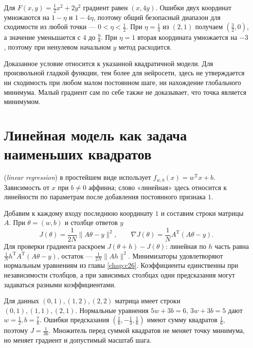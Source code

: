 \begin{example}Для \(F(x,y)=\frac12x^2+2y^2\) градиент равен \((x,4y)\). Ошибки двух координат умножаются на \(1-\eta\) и \(1-4\eta\), поэтому общий безопасный диапазон для сходимости из любой точки --- \(0<\eta<\frac12\). При \(\eta=\frac14\) из \((2,1)\) получаем \((\frac32,0)\), а значение уменьшается с \(4\) до \(\frac98\). При \(\eta=1\) вторая координата умножается на \(-3\), поэтому при ненулевом начальном \(y\) метод расходится.\end{example}
Доказанное условие относится к указанной квадратичной модели. Для произвольной гладкой функции, тем более для нейросети, здесь не утверждается ни сходимость при любом малом постоянном шаге, ни нахождение глобального минимума. Малый градиент сам по себе также не доказывает, что точка является минимумом.
\section{Линейная модель как задача наименьших квадратов}
\begin{definition} (\emph{linear regression}) в простейшем виде использует \(f_{w,b}(x)=w^{\mathrm T}x+b\). Зависимость от \(x\) при \(b\ne0\) аффинна; слово «линейная» здесь относится к линейности по параметрам после добавления постоянного признака \(1\).\end{definition}
Добавим к каждому входу последнюю координату \(1\) и составим строки матрицы \(A\). При \(\theta=(w,b)\) и столбце ответов \(y\)
\[J(\theta)=\frac1{2N}\|A\theta-y\|^2,\qquad \nabla J(\theta)=\frac1N A^{\mathrm T}(A\theta-y).\]
Для проверки градиента раскроем \(J(\theta+h)-J(\theta)\): линейная по \(h\) часть равна \(\frac1N h^{\mathrm T}A^{\mathrm T}(A\theta-y)\), остаток --- \(\frac1{2N}\|Ah\|^2\). Минимизаторы удовлетворяют нормальным уравнениям из главы \ref{chap:c26}. Коэффициенты единственны при независимости столбцов, а при зависимых столбцах одни предсказания могут задаваться разными коэффициентами.
\begin{example}Для данных \((0,1),(1,2),(2,2)\) матрица имеет строки \((0,1),(1,1),(2,1)\). Нормальные уравнения \(5w+3b=6\), \(3w+3b=5\) дают \(w=\frac12,b=\frac76\). Ошибки предсказания \((\frac16,-\frac13,\frac16)\) имеют сумму квадратов \(\frac16\), поэтому \(J=\frac1{36}\). Множитель перед суммой квадратов не меняет точку минимума, но меняет градиент и допустимый масштаб шага.\end{example}
